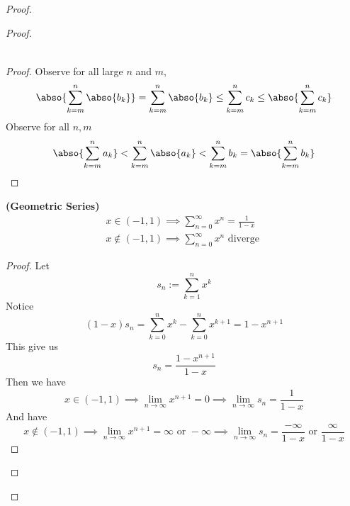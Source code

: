 \documentclass{report}
\begin{document}
\begin{proof}
\begin{proof}
\begin{theorem}
\begin{gather*}
\end{gather*}
\end{theorem}
\begin{proof}
Observe for all large $n$ and $m$,
\begin{equation*}
\abso{\sum_{k=m}^n \abso{b_k}}=\sum_{k=m}^n \abso{b_k}\leq \sum_{k=m}^n c_k\leq \abso{\sum_{k=m}^n c_k}
\end{equation*}
Observe for all $n,m$
\begin{equation*}
\abso{\sum_{k=m}^n a_k}<\sum_{k=m}^n \abso{a_k}<\sum_{k=m}^n b_k=\abso{\sum_{k=m}^n b_k}
\end{equation*}
\end{proof}
\begin{theorem}
\label{4.3.8}
\textbf{(Geometric Series)} 
\begin{align*}
x\in (-1,1)\implies \sum_{n=0}^\infty x^n=\frac{1}{1-x}\\
x\not\in (-1,1)\implies \sum_{n=0}^\infty x^n\text{ diverge }
\end{align*}
\end{theorem}
\begin{proof}
Let 
\begin{equation*}
s_n:=\sum_{k=1}^n x^k
\end{equation*}
Notice
\begin{equation*}
  (1-x)s_n=\sum_{k=0}^n x^k-\sum_{k=0}^n x^{k+1}=1-x^{n+1}
\end{equation*}
This give us
\begin{equation*}
s_n=\frac{1-x^{n+1}}{1-x}
\end{equation*}
Then we have
\begin{equation*}
x\in (-1,1)\implies \lim_{n\to\infty}x^{n+1}=0\implies \lim_{n\to\infty}s_n=\frac{1}{1-x}
\end{equation*}
And have
\begin{equation*}
x\not\in (-1,1)\implies \lim_{n\to\infty}x^{n+1}=\infty\text{ or }-\infty\implies \lim_{n\to\infty}s_n= \frac{-\infty}{1-x}\text{ or }\frac{\infty}{1-x}
\end{equation*}
\end{proof}
\begin{definition}

\end{definition}
\end{proof}
\end{proof}
\end{document}

